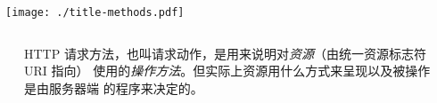 \documentclass[final,table]{beamer}
\begin{document}
  \begin{frame}{}
    \noindent
    \begin{minipage}{\textwidth}
      \centering
      \texttt{[image: ./title-methods.pdf]}
    \end{minipage}
    
    \vspace{0.5in}

    \begin{columns}
      \begin{column}{0.1\textwidth}
      \end{column}
      \begin{column}{0.8\textwidth}
        \begin{block}{}
          \huge
          HTTP 请求方法，也叫请求动作，是用来说明对\emph{资源}（由统一资源标志符 URI 指向）
          使用的\emph{操作方法}。但实际上资源用什么方式来呈现以及被操作是由服务器端
          的程序来决定的。
          \normalsize
        \end{block}
      \end{column}
      \begin{column}{0.1\textwidth}
      \end{column}
    \end{columns}

    \vspace{0.5in}


\end{frame}
\end{document}
